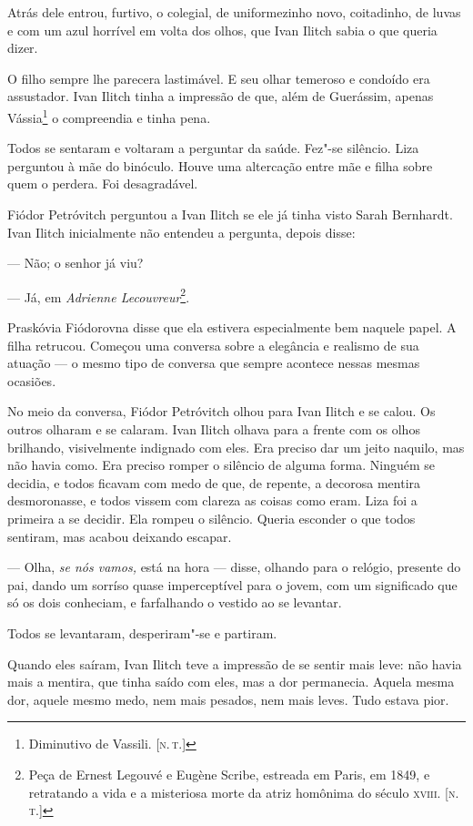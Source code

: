Atrás dele entrou, furtivo, o colegial, de uniformezinho novo,
coitadinho, de luvas e com um azul horrível em volta dos olhos, que Ivan
Ilitch sabia o que queria dizer.

O filho sempre lhe parecera lastimável. E seu olhar temeroso e condoído
era assustador. Ivan Ilitch tinha a impressão de que, além de Guerássim,
apenas Vássia\footnote{Diminutivo de Vassili. {[}\textsc{n.\,t.}{]}} o compreendia
e tinha pena.

Todos se sentaram e voltaram a perguntar da saúde. Fez"-se silêncio. Liza
perguntou à mãe do binóculo. Houve uma altercação entre mãe e filha
sobre quem o perdera. Foi desagradável.

Fiódor Petróvitch perguntou a Ivan Ilitch se ele já tinha visto Sarah
Bernhardt. Ivan Ilitch inicialmente não entendeu a pergunta, depois
disse:

--- Não; o senhor já viu?

--- Já, em \emph{Adrienne Lecouvreur}\footnote{Peça de Ernest Legouvé e
  Eugène Scribe, estreada em Paris, em 1849, e retratando a vida e a
  misteriosa morte da atriz homônima do século \textsc{xviii}. {[}\textsc{n.\,t.}{]}}.

Praskóvia Fiódorovna disse que ela estivera especialmente bem naquele
papel. A filha retrucou. Começou uma conversa sobre a elegância e
realismo de sua atuação --- o mesmo tipo de conversa que sempre acontece
nessas mesmas ocasiões.

No meio da conversa, Fiódor Petróvitch olhou para Ivan Ilitch e se
calou. Os outros olharam e se calaram. Ivan Ilitch olhava para a frente
com os olhos brilhando, visivelmente indignado com eles. Era preciso dar
um jeito naquilo, mas não havia como. Era preciso romper o silêncio de
alguma forma. Ninguém se decidia, e todos ficavam com medo de que, de
repente, a decorosa mentira desmoronasse, e todos vissem com clareza as
coisas como eram. Liza foi a primeira a se decidir. Ela rompeu o
silêncio. Queria esconder o que todos sentiram, mas acabou deixando
escapar.

--- Olha, \emph{se nós vamos,} está na hora --- disse, olhando para o
relógio, presente do pai, dando um sorríso quase imperceptível para o
jovem, com um significado que só os dois conheciam, e farfalhando o
vestido ao se levantar.

Todos se levantaram, desperiram"-se e partiram.

Quando eles saíram, Ivan Ilitch teve a impressão de se sentir mais leve:
não havia mais a mentira, que tinha saído com eles, mas a dor
permanecia. Aquela mesma dor, aquele mesmo medo, nem mais pesados, nem
mais leves. Tudo estava pior.

